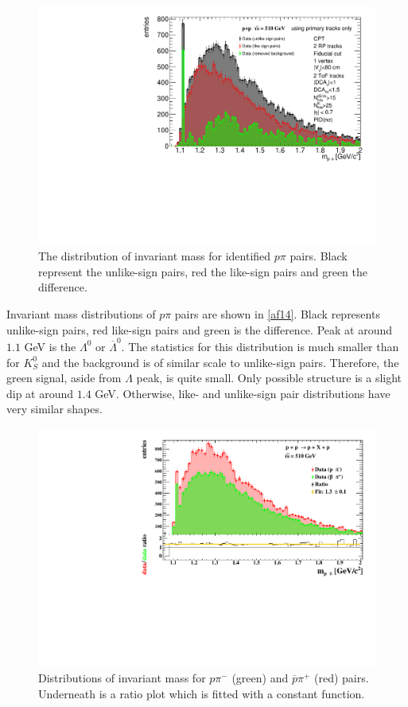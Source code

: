\FloatBarrier
\begin{figure}[ht]
    \centering
    \includegraphics[width=1\textwidth]{figures/invMassLikeUnlikeLambda.pdf}
    \caption[Results for fit 1 of invariant mass of $p \pi$ pairs]{The distribution of invariant mass for identified $p \pi$ pairs.  Black represent the unlike-sign pairs, red the like-sign pairs and green the difference.}
    \label{af14}
\end{figure}
\FloatBarrier
Invariant mass distributions of $p \pi$ pairs are shown in \autoref{af14}. Black represents unlike-sign pairs, red like-sign pairs and green is the difference. Peak at around $1.1$ GeV is the $\Lambda^0$ or $\overline{\Lambda}^0$. The statistics for this distribution is much smaller than for $K^0_S$ and the background is of similar scale to unlike-sign pairs. Therefore, the green signal, aside from $\Lambda$ peak, is quite small. Only possible structure is a slight dip at around $1.4$ GeV. Otherwise, like- and unlike-sign pair distributions have very similar shapes. 
\FloatBarrier
\begin{figure}[ht]
    \centering
    \includegraphics[width=1\textwidth]{figures/LambdaAntiLambda.pdf}
    \caption[Distributions of invariant mass for $p \pi^-$ and $\overline{p} \pi^+$ pairs]{Distributions of invariant mass for $p \pi^-$ (green) and $\overline{p} \pi^+$ (red) pairs. Underneath is a ratio plot which is fitted with a constant function.}
    \label{af19}
\end{figure}
\FloatBarrier

